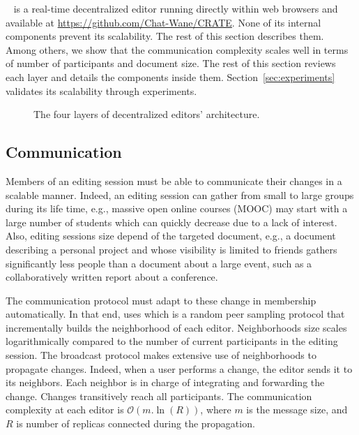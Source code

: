 \CRATE~\cite{nedelec2016crate} is a real-time decentralized editor running
directly within web browsers and available at
\url{https://github.com/Chat-Wane/CRATE}. None of its internal components
prevent its scalability. The rest of this section describes them. Among others,
we show that the communication complexity scales well in terms of number of
participants and document size. The rest of this section reviews each layer and
details the components inside them. Section~\ref{sec:experiments} validates its
scalability through experiments.

\begin{figure}
  \centering
  
  \caption{\label{fig:architecture}The four layers of decentralized editors'
    architecture.}
\end{figure}

\subsection{Communication}
\label{subsec:communication}

Members of an editing session must be able to communicate their changes in a
scalable manner. Indeed, an editing session can gather from small to large
groups during its life time, e.g., massive open online courses (MOOC) may start
with a large number of students which can quickly decrease due to a lack of
interest. Also, editing sessions size depend of the targeted document, e.g., a
document describing a personal project and whose visibility is limited to
friends gathers significantly less people than a document about a large event,
such as a collaboratively written report about a conference.

The communication protocol must adapt to these change in membership
automatically. In that end, \CRATE uses \SPRAY which is a random peer sampling
protocol that incrementally builds the neighborhood of each editor.
Neighborhoods size scales logarithmically compared to the number of current
participants in the editing session. The broadcast protocol makes extensive use
of neighborhoods to propagate changes. Indeed, when a user performs a change,
the editor sends it to its neighbors. Each neighbor is in charge of integrating
and forwarding the change. Changes transitively reach all participants. The
communication complexity at each editor is $\mathcal{O}(m.\ln(R))$, where $m$ is
the message size, and $R$ is number of replicas connected during the
propagation.



